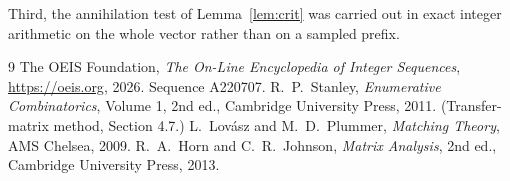 \documentclass[11pt,a4paper]{article}
\theoremstyle{plain}
\theoremstyle{definition}
\begin{document}
Third, the annihilation test of Lemma~\ref{lem:crit} was carried out in exact integer
arithmetic on the whole vector rather than on a sampled prefix.

\begin{thebibliography}{9}
 The OEIS Foundation, \emph{The On-Line Encyclopedia of Integer
Sequences}, \url{https://oeis.org}, 2026. Sequence A220707.
 R.~P.~Stanley, \emph{Enumerative Combinatorics}, Volume 1, 2nd ed.,
Cambridge University Press, 2011. (Transfer-matrix method, Section 4.7.)
 L.~Lov\'asz and M.~D.~Plummer, \emph{Matching Theory}, AMS Chelsea,
2009.
 R.~A.~Horn and C.~R.~Johnson, \emph{Matrix Analysis}, 2nd ed., Cambridge
University Press, 2013.
\end{thebibliography}
\end{document}
